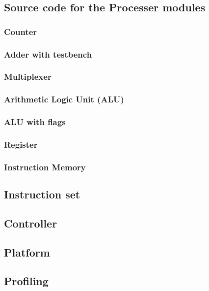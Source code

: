 \documentclass[12pt,a4paper]{article}
\begin{document}
\subsection{Source code for the Processer modules}
	\subsubsection{Counter}
			
	\subsubsection{Adder with testbench}
			
	\subsubsection{Multiplexer}
			
	\subsubsection{Arithmetic Logic Unit (ALU)}
		
	\subsubsection{ALU with flags}
			
	\subsubsection{Register}
			
	\subsubsection{Instruction Memory}
			
\subsection{Instruction set}
		
\subsection{Controller}
\subsection{Platform}
		
\subsection{Profiling}
	\label{toggle_full}	
	
\end{document}
